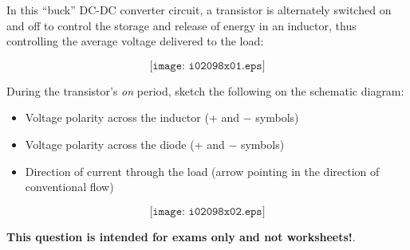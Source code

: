 

In this ``buck'' DC-DC converter circuit, a transistor is alternately switched on and off to control the storage and release of energy in an inductor, thus controlling the average voltage delivered to the load:

$$\texttt{[image: i02098x01.eps]}$$

During the transistor's {\it on} period, sketch the following on the schematic diagram:

\begin{itemize}
\item{} Voltage polarity across the inductor (+ and $-$ symbols)
\vskip 5pt
\item{} Voltage polarity across the diode (+ and $-$ symbols)
\vskip 5pt
\item{} Direction of current through the load (arrow pointing in the direction of conventional flow)
\end{itemize}







$$\texttt{[image: i02098x02.eps]}$$







{\bf This question is intended for exams only and not worksheets!}.


